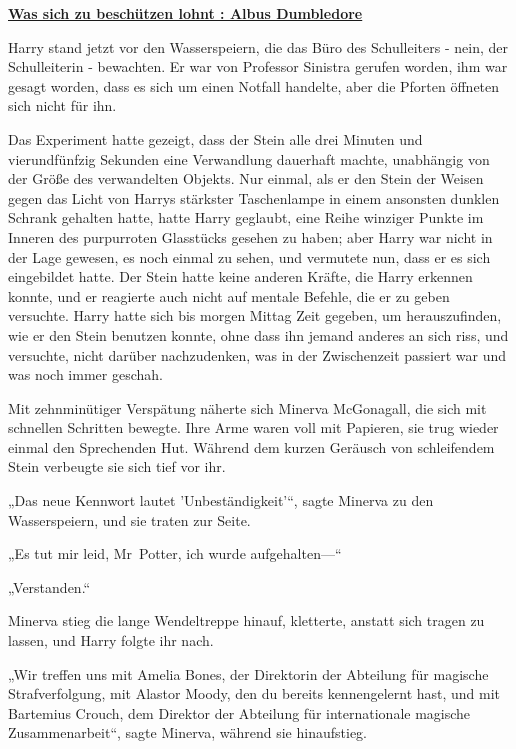

\hypertarget{was-sich-zu-beschuxfctzen-lohnt-albus-dumbledore}{%

\textbf{\uline{Was sich zu beschützen lohnt : Albus Dumbledore}}

Harry stand jetzt vor den Wasserspeiern, die das Büro des Schulleiters - nein, der Schulleiterin - bewachten. Er war von Professor Sinistra gerufen worden, ihm war gesagt worden, dass es sich um einen Notfall handelte, aber die Pforten öffneten sich nicht für ihn.

Das Experiment hatte gezeigt, dass der Stein alle drei Minuten und vierundfünfzig Sekunden eine Verwandlung dauerhaft machte, unabhängig von der Größe des verwandelten Objekts. Nur einmal, als er den Stein der Weisen gegen das Licht von Harrys stärkster Taschenlampe in einem ansonsten dunklen Schrank gehalten hatte, hatte Harry geglaubt, eine Reihe winziger Punkte im Inneren des purpurroten Glasstücks gesehen zu haben; aber Harry war nicht in der Lage gewesen, es noch einmal zu sehen, und vermutete nun, dass er es sich eingebildet hatte. Der Stein hatte keine anderen Kräfte, die Harry erkennen konnte, und er reagierte auch nicht auf mentale Befehle, die er zu geben versuchte. Harry hatte sich bis morgen Mittag Zeit gegeben, um herauszufinden, wie er den Stein benutzen konnte, ohne dass ihn jemand anderes an sich riss, und versuchte, nicht darüber nachzudenken, was in der Zwischenzeit passiert war und was noch immer geschah.

Mit zehnminütiger Verspätung näherte sich Minerva McGonagall, die sich mit schnellen Schritten bewegte. Ihre Arme waren voll mit Papieren, sie trug wieder einmal den Sprechenden Hut. Während dem kurzen Geräusch von schleifendem Stein verbeugte sie sich tief vor ihr.

„Das neue Kennwort lautet 'Unbeständigkeit'“, sagte Minerva zu den Wasserspeiern, und sie traten zur Seite.

„Es tut mir leid, Mr~Potter, ich wurde aufgehalten—“

„Verstanden.“

Minerva stieg die lange Wendeltreppe hinauf, kletterte, anstatt sich tragen zu lassen, und Harry folgte ihr nach.

„Wir treffen uns mit Amelia Bones, der Direktorin der Abteilung für magische Strafverfolgung, mit Alastor Moody, den du bereits kennengelernt hast, und mit Bartemius Crouch, dem Direktor der Abteilung für internationale magische Zusammenarbeit“, sagte Minerva, während sie hinaufstieg.

}
